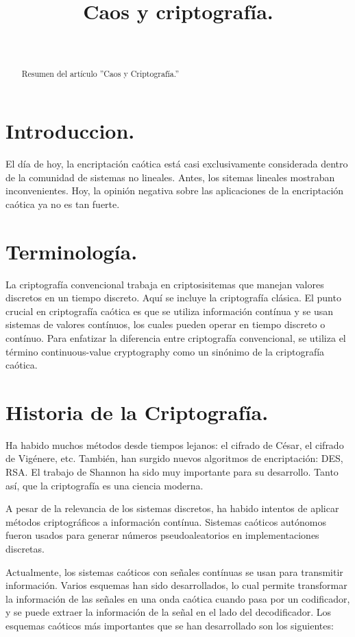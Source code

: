 \documentclass[10pt]{IEEEtran}
\title {Caos y criptografía.}
\author{\IEEEauthorblockN{Marcos Daniel Calderón Calderón}\\
\IEEEauthorblockA{Maestría en Ciencias de la Computación\\
Centro de Investigación en Matemáticas (CIMAT)\\
Guanajuato , Gto.\\
marcos.calderon@cimat.mx}}
\begin{document}
\maketitle
\begin{abstract}
Resumen del artículo ''Caos y Criptografía.''
\end{abstract}

\section{Introduccion.}

El día de hoy, la encriptación caótica está casi exclusivamente considerada dentro de la comunidad de sistemas no lineales. Antes, los sitemas lineales mostraban inconvenientes. Hoy, la opinión negativa sobre las aplicaciones de la encriptación caótica ya no es tan fuerte. 


\section{Terminología.}
La criptografía convencional trabaja en criptosisitemas que manejan valores discretos en un tiempo discreto. Aquí se incluye la criptografía clásica. El punto crucial en criptografía caótica es que se utiliza información contínua y se usan sistemas de valores contínuos, los cuales pueden operar en tiempo discreto o contínuo. Para enfatizar la diferencia entre criptografía convencional, se utiliza el término continuous-value  cryptography  como un sinónimo de la criptografía caótica. 

 
\section{Historia de la Criptografía.}
Ha habido muchos métodos desde tiempos lejanos: el cifrado de César, el cifrado de Vigénere, etc. También, han surgido nuevos algoritmos de encriptación: DES, RSA. El trabajo de Shannon ha sido muy importante para su desarrollo. Tanto así, que la criptografía es una ciencia moderna.

A pesar de la relevancia de los sistemas discretos, ha habido intentos de aplicar métodos criptográficos a información contínua. Sistemas caóticos autónomos fueron usados para generar números pseudoaleatorios en implementaciones discretas.

Actualmente, los sistemas caóticos con señales contínuas se usan para transmitir información. Varios esquemas han sido desarrollados, lo cual permite transformar la información de las señales en una onda caótica cuando pasa por un codificador, y se puede extraer la información de la señal en el lado del decodificador. Los esquemas caóticos más importantes que se han desarrollado son los siguientes:
\end{document}

